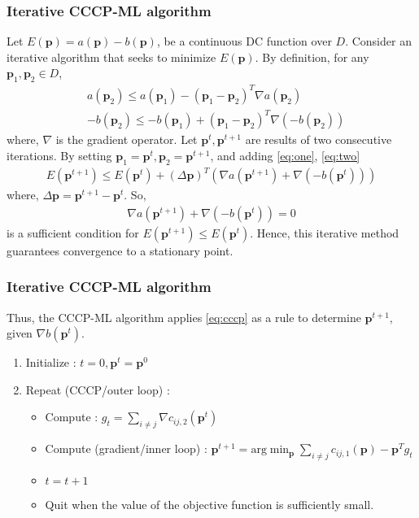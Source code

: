 \documentclass{beamer}
\begin{document}
\begin{frame} 
\frametitle{Iterative CCCP-ML algorithm} 
Let $E(\bm{p})=a(\bm{p})-b(\bm{p})$, be a continuous DC function over $D$. Consider an iterative algorithm that seeks to minimize $E(\bm{p})$. By definition, for any $\bm{p}_{1},\bm{p}_{2}\in D$,
\begin{align}
    \label{eq:one}
    &a(\bm{p}_{2})\leq a(\bm{p}_{1})-(\bm{p}_{1}-\bm{p}_{2})^{T}\nabla a(\bm{p}_{2})\\
    \label{eq:two}
    &-b(\bm{p}_{2})\leq -b(\bm{p}_{1})+(\bm{p}_{1}-\bm{p}_{2})^{T}\nabla (-b(\bm{p}_{2}))
\end{align}
where, $\nabla$ is the gradient operator. Let $\bm{p}^{t},\bm{p}^{t+1}$ are results of two consecutive iterations. By setting $\bm{p}_{1}=\bm{p}^{t},\bm{p}_{2}=\bm{p}^{t+1}$, and adding \eqref{eq:one}, \eqref{eq:two}
\begin{align}
\label{eq:wow}
    E(\bm{p}^{t+1})\leq E(\bm{p}^{t})+(\Delta \bm{p})^{T}(\nabla a(\bm{p}^{t+1})+ \nabla (-b(\bm{p}^{t})))
\end{align}
where, $\Delta\bm{p}=\bm{p}^{t+1}-\bm{p}^{t}$.  So,  
\begin{align}
\label{eq:cccp}
    \nabla a(\bm{p}^{t+1})+ \nabla (-b(\bm{p}^{t}))=0
\end{align}
is a sufficient condition for $E(\bm{p}^{t+1})\leq E(\bm{p}^{t})$. Hence, this iterative method guarantees convergence to a stationary point. 

\end{frame}

\begin{frame}
\frametitle{Iterative CCCP-ML algorithm}
Thus, the CCCP-ML algorithm applies \eqref{eq:cccp} as a rule to determine $\bm{p}^{t+1}$, given $\nabla b(\bm{p}^{t})$.
    \begin{enumerate}
    \item Initialize : $t=0,\bm{p}^{t}=\bm{p}^{0}$
    \item Repeat (CCCP/outer loop) :
    \begin{itemize}
        \item Compute : $g_{t}=\displaystyle \sum_{i\neq j}\nabla c_{ij,2}(\bm{p}^{t})$
        \item Compute (gradient/inner loop) : $\bm{p}^{t+1}=\text{arg}\min_{\bm{p}}\displaystyle \sum_{i\neq j}c_{ij,1}(\bm{p})-\bm{p}^{T}g_{t}$
        \item $t=t+1$
        \item  Quit when the value of the objective function is sufficiently small.
        \end{itemize}
\end{enumerate}
\end{frame}
\end{document}
